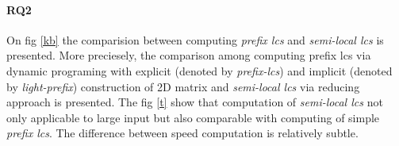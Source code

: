 \paragraph{RQ2}

On fig \ref{kb} the comparision between computing \emph{prefix lcs} and \emph{semi-local lcs} is presented.
More preciesely, the comparison among computing prefix lcs via dynamic programing with explicit (denoted by \emph{prefix-lcs}) and implicit (denoted by \emph{light-prefix})  construction of 2D matrix and \emph{semi-local lcs} via reducing approach is presented.
The fig \ref{t} show that computation of \emph{semi-local lcs} not only applicable to large input but also comparable with computing of simple \emph{prefix lcs}.
The difference between speed computation is relatively subtle. 
 










 
